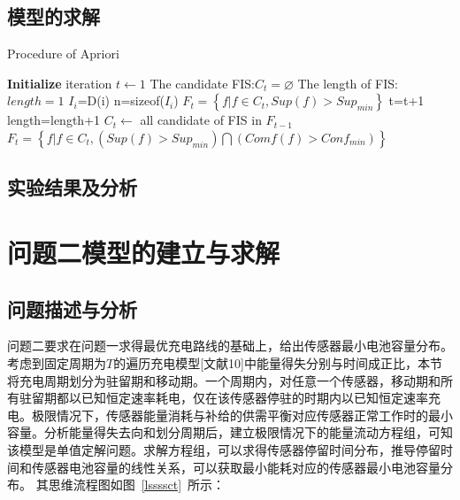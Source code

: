 \documentclass{whutmod}
\begin{document}
		\subsection{模型的求解}
			\begin{algorithm}[H]
			 	\caption{Procedure of Apriori}  
			 	\LinesNumbered  
			 	\textbf{Initialize} \newline
			 	iteration $t\leftarrow 1$ \newline
			 	The candidate FIS:$C_{t}=\varnothing$ \newline
			 	The length of FIS:$length=1$ \newline
			 	{$I_{i}$=D(i)\newline
			 		n=sizeof($I_{i}$)\newline
			 	}
			 	$F_{t}=\left \{ f|f\in C_{t},Sup(f)>Sup_{min}\right \}$\newline
			 	{ t=t+1\newline 
			 		length=length+1\newline	
			 		$C_{t}\leftarrow $ all candidate of FIS in $F_{t-1}$\newline
			 		$F_{t}=\left \{ f|f\in C_{t},(Sup(f)>Sup_{min})\bigcap (Comf(f)>Conf_{min}) \right\}$\newline
			 	}	
			\end{algorithm} 
		
        \subsection{实验结果及分析}
  
	\section{问题二模型的建立与求解}
		\subsection{问题描述与分析}
			问题二要求在问题一求得最优充电路线的基础上，给出传感器最小电池容量分布。考虑到固定周期为$T$的遍历充电模型[文献10]中能量得失分别与时间成正比，本节将充电周期划分为驻留期和移动期。一个周期内，对任意一个传感器，移动期和所有驻留期都以已知恒定速率耗电，仅在该传感器停驻的时期内以已知恒定速率充电。极限情况下，传感器能量消耗与补给的供需平衡对应传感器正常工作时的最小容量。分析能量得失去向和划分周期后，建立极限情况下的能量流动方程组，可知该模型是单值定解问题。求解方程组，可以求得传感器停留时间分布，推导停留时间和传感器电池容量的线性关系，可以获取最小能耗对应的传感器最小电池容量分布。
			其思维流程图如图~\ref{lssssct}~所示：
			
\end{document}
